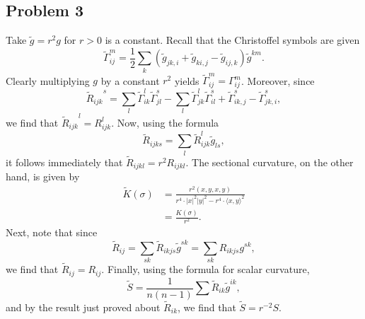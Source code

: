 \documentclass{../mathnotes}
\begin{document}
\subsection*{Problem 3}
Take $\tilde g=r^2g$ for $r>0$ is a constant. Recall that the Christoffel symbols
are given
\[\tilde \Gamma_{ij}^m=\frac{1}{2}\sum_k\left( \tilde g_{jk,i}+\tilde g_{ki,j}-\tilde g_{ij,k} \right)\tilde g^{km}.\]
Clearly multiplying $g$ by a constant $r^2$ yields $\tilde\Gamma^m_{ij}=\Gamma^m_{ij}$.
Moreover, since
\[{\tilde R_{ijk}}^s=\sum_l\tilde\Gamma_{ik}^l\tilde\Gamma_{jl}^s-\sum_l\tilde\Gamma_{jk}^l\tilde\Gamma_{il}^s+\tilde\Gamma_{ik,j}^s-\tilde\Gamma_{jk,i}^s,\]
we find that ${\tilde{R}_{ijk}}^l=R_{ijk}^l.$
Now, using the formula
\[\tilde R_{ijks}=\sum_l\tilde R_{ijk}^l\tilde g_{ls},\]
it follows immediately that $\tilde R_{ijkl}=r^2R_{ijkl}$. The sectional curvature,
on the other hand, is given by
\begin{align*}
    \tilde K(\sigma) &= \frac{r^2(x,y,x,y)}{r^4\cdot|x|^2|y|^2-r^4\cdot \langle x, y\rangle^2}\\
    &= \frac{K(\sigma)}{r^2}.
\end{align*}
Next, note that since
\[\tilde R_{ij}=\sum_{sk}\tilde R_{ikjs}\tilde g^{sk}=\sum_{sk}R_{ikjs}g^{sk},\]
we find that $\tilde R_{ij}=R_{ij}$. Finally, using the formula for
scalar curvature,
\[\tilde S=\frac{1}{n(n-1)}\sum \tilde R_{ik}\tilde g^{ik},\]
and by the result just proved about $\tilde R_{ik}$, we find that
$\tilde S=r^{-2} S$.
\end{document}
